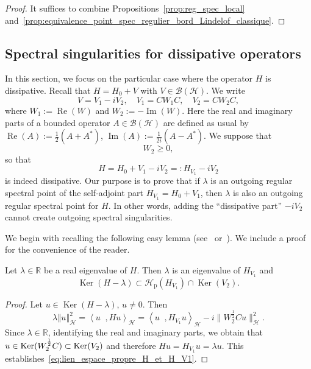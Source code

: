 \documentclass[AHL,Unicode,longabstracts,published]{cedram}
\newcommand{\Hi}{\mathcal{H}}
\newcommand{\R}{\mathbb{R}}
\newcommand{\norme}[1]{\left\Vert #1\right\Vert}
\newcommand{\scal}[2]{\left\langle{#1} \middle., {#2}\right\rangle}
\newcommand{\clB}{\mathcal{B}}
\DeclareMathOperator{\Ker}{Ker}
\DeclareMathOperator{\im}{Im}
\DeclareMathOperator{\re}{Re}
\newcommand{\Hi}{\mathcal{H}}
\newcommand{\R}{\mathbb{R}}
\DeclareMathOperator{\im}{Im}
\begin{document}
\begin{proof}
It suffices to combine Propositions~\ref{prop:reg_spec_local} and~\ref{prop:equivalence_point_spec_regulier_bord_Lindelof_classique}.
\end{proof}



\subsection{Spectral singularities for dissipative operators}\label{sec:dissipative case}

In this section, we focus on the particular case where the operator $H$ is dissipative. Recall that $H=H_0+V$ with $V\in\clB(\Hi)$. We write
\begin{equation*}
V = V_1 - i V_2, \quad V_1=CW_1C, \quad V_2=CW_2C,
\end{equation*}
where $W_1:=\re(W)$ and $W_2:=-\im(W)$. Here the real and imaginary parts of a bounded operator $A\in\clB(\Hi)$ are defined as usual by $\re(A):=\frac{1}{2}(A+A^*)$, $\im(A):=\frac{1}{2i}(A-A^*)$. We suppose that
\begin{equation*}
W_2\ge0,
\end{equation*}
so that
\begin{equation*}
H=H_0+V_1-iV_2=: H_{V_1}-iV_2
\end{equation*}
is indeed dissipative. Our purpose is to prove that if $\lambda$ is an outgoing regular spectral point of the self-adjoint part $H_{V_1}=H_0+V_1$, then $\lambda$ is also an outgoing regular spectral point for $H$. In other words, adding the ``dissipative part'' $-iV_2$ cannot create outgoing spectral singularities.


We begin with recalling the following easy lemma (see~\cite[Lemma~6.1]{Da80_01} or~\cite[Lemma~3.1]{FaFr18_01}). We include a proof for the convenience of the reader.

\begin{lemm}\label{lm:eigen-diss}
Let $\lambda\in\R$ be a real eigenvalue of $H$. Then $\lambda$ is an eigenvalue of $H_{V_1}$ and
\begin{equation}\label{eq:lien_espace_propre_H_et_H_V1}
\Ker(H-\lambda)\subset\mathcal{H}_\mathrm{p}(H_{V_1})\cap\Ker(V_2).
\end{equation}
\end{lemm}

\begin{proof}
Let $u\in\Ker(H-\lambda)$, $u\neq0$. Then
\begin{equation*}
\lambda\norme{u}_\Hi^2=\scal{u}{Hu}_\Hi=\scal{u}{H_{V_1}u}_\Hi-i\Big \|W_2^\frac{1}{2}Cu\Big\|_\Hi^2.
\end{equation*}
Since $\lambda\in\R$, identifying the real and imaginary parts, we obtain that $u\in\Ker(W_2^\frac{1}{2}C)\linebreak[4]\subset\Ker(V_2)$ and therefore $Hu=H_{V_1}u=\lambda u$. This establishes~\eqref{eq:lien_espace_propre_H_et_H_V1}.
\end{proof}
\end{document}
